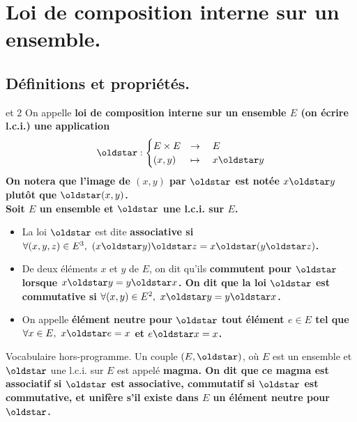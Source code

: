 \documentclass[11pt]{article}
\begin{document}


\renewcommand*{\s}{\oldstar}

\thispagestyle{fancy}

\section{Loi de composition interne sur un ensemble.}

\subsection{Définitions et propriétés.}

\begin{defi}{\unskip et 2}{}
    On appelle \bf{loi de composition interne} sur un ensemble $E$ (on écrire l.c.i.) une application
    \begin{equation*}
        \s:\begin{cases}
            E \times E &\to \quad E\\
            (x,y) &\mapsto \quad x\s y
        \end{cases}
    \end{equation*}
    On notera que l'image de $(x,y)$ par $\s$ est notée $x\s y$ plutôt que $\s(x,y)$.\\
    Soit $E$ un ensemble et $\s$ une l.c.i. sur $E$.
    \begin{itemize}
        \item La loi $\s$ est dite \bf{associative} si $\forall (x,y,z)\in E^3, ~ (x\s y)\s z = x\s (y \s z)$.
        \item De deux éléments $x$ et $y$ de $E$, on dit qu'ils \bf{commutent} pour $\s$ lorsque $x\s y = y\s x$.
        On dit que la loi $\s$ est \bf{commutative} si $\forall (x,y)\in E^2, ~ x \s y = y \s x$.
        \item On appelle \bf{élément neutre} pour $\s$ tout élément $e\in E$ tel que $\forall x\in E, ~ x \s e = x$ et $e \s x = x$.
    \end{itemize}
\end{defi}

\begin{defi}{Vocabulaire hors-programme.}{}
    Un couple $(E,\s)$, où $E$ est un ensemble et $\s$ une l.c.i. sur $E$ est appelé \bf{magma}.\n
    On dit que ce magma est associatif si $\s$ est associative, commutatif si $\s$ est commutative, et \bf{unifère} s'il existe dans $E$ un élément neutre pour $\s$.
\end{defi}
\end{document}
